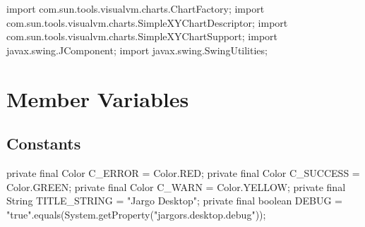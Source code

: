 \nwenddocs{}\plusendmoddef
import com.sun.tools.visualvm.charts.ChartFactory;
import com.sun.tools.visualvm.charts.SimpleXYChartDescriptor;
import com.sun.tools.visualvm.charts.SimpleXYChartSupport;
import javax.swing.JComponent;
import javax.swing.SwingUtilities;
\nwendcode{}\nwdocspar

\section{Member Variables}

\subsection{Constants}
\nwenddocs{}\endmoddef{}
private final Color C_ERROR   = Color.RED;
private final Color C_SUCCESS = Color.GREEN;
private final Color C_WARN    = Color.YELLOW;
private final String TITLE_STRING = "Jargo Desktop";
private final boolean DEBUG =
    "true".equals(System.getProperty("jargors.desktop.debug"));
\nwendcode{}\nwdocspar

